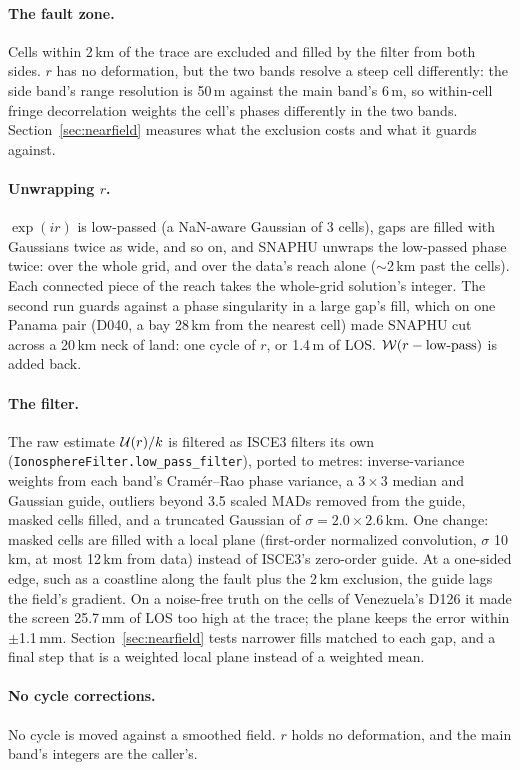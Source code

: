 \paragraph{The fault zone.} Cells within 2\,km of the trace are excluded and filled by the filter from both sides.
$r$ has no deformation, but the two bands resolve a steep cell differently: the side band's range resolution is
50\,m against the main band's 6\,m, so within-cell fringe decorrelation weights the cell's phases differently in
the two bands. Section~\ref{sec:nearfield} measures what the exclusion costs and what it guards against.

\paragraph{Unwrapping $r$.} $\exp(ir)$ is low-passed (a NaN-aware Gaussian of 3 cells), gaps are filled with
Gaussians twice as wide, and so on, and SNAPHU unwraps the low-passed phase twice: over the whole grid, and over the
data's reach alone ($\sim$2\,km past the cells). Each connected piece of the reach takes the whole-grid solution's
integer. The second run guards against a phase singularity in a large gap's fill, which on one Panama pair
(D040, a bay 28\,km from the nearest cell) made SNAPHU cut across a 20\,km neck of land: one cycle of $r$, or 1.4\,m
of LOS. $\mathcal{W}(r - \text{low-pass})$ is added back.

\paragraph{The filter.} The raw estimate $\mathcal{U}(r)/k$ is filtered as ISCE3 filters its own
(\texttt{IonosphereFilter.\allowbreak low\_pass\_filter}), ported to metres: inverse-variance weights from each band's
Cram\'er--Rao phase variance, a $3\times3$ median and Gaussian guide, outliers beyond 3.5 scaled MADs removed from the
guide, masked cells filled, and a truncated Gaussian of $\sigma = 2.0\times2.6$\,km. One change: masked cells are
filled with a local plane (first-order normalized convolution, $\sigma$ 10\,km, at most 12\,km from data) instead of
ISCE3's zero-order guide. At a one-sided edge, such as a coastline along the fault plus the 2\,km exclusion, the guide
lags the field's gradient. On a noise-free truth on the cells of Venezuela's D126 it made the screen 25.7\,mm of LOS
too high at the trace; the plane keeps the error within $\pm$1.1\,mm. Section~\ref{sec:nearfield} tests narrower
fills matched to each gap, and a final step that is a weighted local plane instead of a weighted mean.

\paragraph{No cycle corrections.} No cycle is moved against a smoothed field. $r$ holds no deformation, and the
main band's integers are the caller's.
